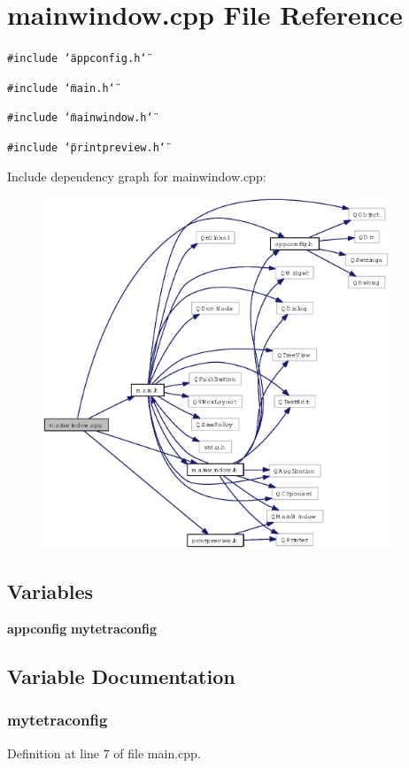 \section{mainwindow.cpp File Reference}
\label{mainwindow_8cpp}
{\tt \#include \char`\"{}appconfig.h\char`\"{}}\par
{\tt \#include \char`\"{}main.h\char`\"{}}\par
{\tt \#include \char`\"{}mainwindow.h\char`\"{}}\par
{\tt \#include \char`\"{}printpreview.h\char`\"{}}\par


Include dependency graph for mainwindow.cpp:\begin{figure}[H]
\begin{center}
\leavevmode
\includegraphics[width=294pt]{mainwindow_8cpp__incl}
\end{center}
\end{figure}
\subsection*{Variables}
\begin{CompactItemize}
\item 
{\bf appconfig} {\bf mytetraconfig}
\end{CompactItemize}


\subsection{Variable Documentation}
\subsubsection{ {\bf mytetraconfig}}\label{mainwindow_8cpp_69bd0a7d678d494effdef51808501712}




Definition at line 7 of file main.cpp.